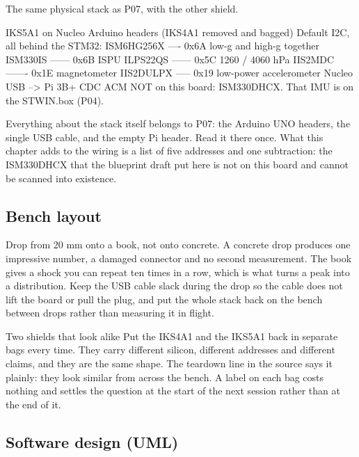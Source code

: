\begin{asciiart}
The same physical stack as P07, with the other shield.

IKS5A1 on Nucleo Arduino headers   (IKS4A1 removed and bagged)
Default I2C, all behind the STM32:
  ISM6HG256X ---- 0x6A     low-g and high-g together
  ISM330IS ------ 0x6B     ISPU
  ILPS22QS ------ 0x5C     1260 / 4060 hPa
  IIS2MDC ------- 0x1E     magnetometer
  IIS2DULPX ----- 0x19     low-power accelerometer
Nucleo USB --> Pi 3B+      CDC ACM
NOT on this board: ISM330DHCX.  That IMU is on the STWIN.box (P04).
\end{asciiart}

Everything about the stack itself belongs to P07: the Arduino UNO headers, the single USB
cable, and the empty Pi header. Read it there once. What this chapter adds to the wiring is
a list of five addresses and one subtraction: the ISM330DHCX that the blueprint draft put
here is not on this board and cannot be scanned into existence.

\subsection*{Bench layout}


Drop from 20 mm onto a book, not onto concrete. A concrete drop produces one impressive
number, a damaged connector and no second measurement. The book gives a shock you can
repeat ten times in a row, which is what turns a peak into a distribution. Keep the USB
cable slack during the drop so the cable does not lift the board or pull the plug, and put
the whole stack back on the bench between drops rather than measuring it in flight.

\begin{note}{Two shields that look alike}
Put the IKS4A1 and the IKS5A1 back in separate bags every time. They carry different
silicon, different addresses and different claims, and they are the same shape. The
teardown line in the source says it plainly: they look similar from across the bench. A
label on each bag costs nothing and settles the question at the start of the next session
rather than at the end of it.
\end{note}

\subsection*{Software design (UML)}

